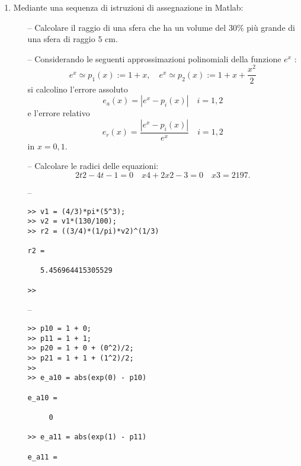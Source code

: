 \begin{enumerate}

\item Mediante una sequenza di istruzioni di assegnazione in Matlab:
\begin{itemize}
\item[--]
Calcolare il raggio di una sfera che ha un volume del $30\%$ più grande di 
una sfera di raggio $5$ cm.
\item[--]
Considerando le seguenti approssimazioni polinomiali della funzione $e^x$ :
\[
e^x \simeq p_1(x) := 1 + x, \quad
e^x \simeq p_2(x) := 1 + x +\frac{x^2}{2}\]
si calcolino l’errore assoluto
\[e_a (x) = |e^x − p_i (x)| \quad i = 1, 2\]
e l’errore relativo
\[e_r(x) = \frac{|e^x − p_i(x)|}{e^x} \quad i = 1, 2\]
in $x = 0,1$.
\item[--] Calcolare le radici delle equazioni:
\[2t2 − 4t − 1 = 0 \quad
x4 + 2x2 − 3 = 0 \quad
x3 = 2197.\]
\end{itemize}

\begin{svol}
\begin{itemize}
\item[--]
\begin{codice}
\begin{verbatim}
>> v1 = (4/3)*pi*(5^3);
>> v2 = v1*(130/100);
>> r2 = ((3/4)*(1/pi)*v2)^(1/3)

r2 =

   5.456964415305529

>> 
\end{verbatim}
\end{codice}
\item[--]
\begin{codice}
\begin{verbatim}
>> p10 = 1 + 0;
>> p11 = 1 + 1;
>> p20 = 1 + 0 + (0^2)/2;
>> p21 = 1 + 1 + (1^2)/2;
>> 
>> e_a10 = abs(exp(0) - p10)

e_a10 =

     0

>> e_a11 = abs(exp(1) - p11)

e_a11 =


\end{verbatim}
\end{codice}
\end{itemize}
\end{svol}
\end{enumerate}
